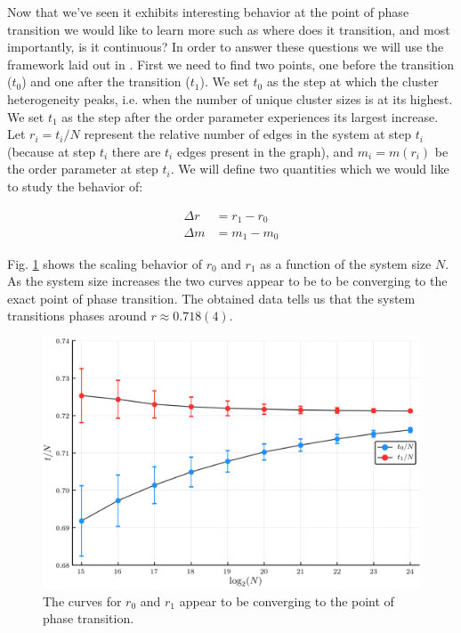 Now that we've seen it exhibits interesting behavior at the point of phase transition we would like to learn more such as where does it transition, and most importantly, is it continuous?
In order to answer these questions we will use the framework laid out in \cite{Lee_1}.
First we need to find two points, one before the transition ($t_0$) and one after the transition ($t_1$).
We set $t_0$ as the step at which the cluster heterogeneity peaks, i.e. when the number of unique cluster sizes is at its highest.
We set $t_1$ as the step after the order parameter experiences its largest increase.
Let $r_i = t_i / N$ represent the relative number of edges in the system at step $t_i$ (because at step $t_i$ there are $t_i$ edges present in the graph), and $m_i = m(r_i)$ be the order parameter at step $t_i$.
We will define two quantities which we would like to study the behavior of:

\begin{equation}
\begin{split}
	\Delta r &= r_1 - r_0 \\
	\Delta m &= m_1 - m_0
\end{split}
\end{equation}

Fig. \ref{fig:r_scaling} shows the scaling behavior of $r_0$ and $r_1$ as a function of the system size $N$.
As the system size increases the two curves appear to be to be converging to the exact point of phase transition.
The obtained data tells us that the system transitions phases around $r \approx 0.718(4)$.

\begin{figure}[H]
	\centering
	\includegraphics[width=350pt, clip]{images/r_scaling.png}
	\caption{The curves for $r_0$ and $r_1$ appear to be converging to the point of phase transition.}
	\label{fig:r_scaling}
\end{figure}

